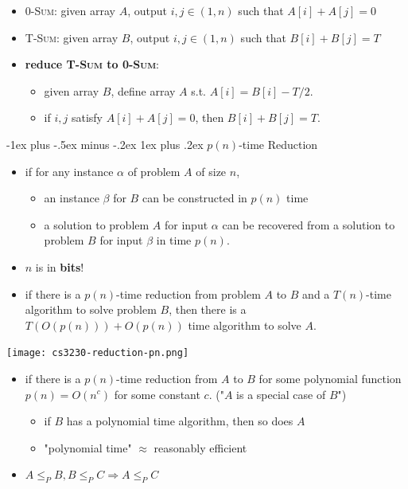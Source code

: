 \documentclass[10pt, landscape]{article}
\makeatletter
\renewcommand{\subsubsection}{\@startsection{subsubsection}{3}{0mm}%
  {-1ex plus -.5ex minus -.2ex}%
  {1ex plus .2ex}%
{\normalfont\small\bfseries}}%
\makeatother
\begin{document}
\begin{multicols*}{4}
  \begin{itemize}
    \item \textsc{0-Sum}: given array $A$, output $i, j \in (1, n)$ such that $A[i] + A[j] = 0$
    \item \textsc{T-Sum}: given array $B$, output $i, j \in (1, n)$ such that $B[i] + B[j] = T$
    \item \textbf{reduce \textsc{T-Sum} to \textsc{0-Sum}}:
      \begin{itemize}
        \item given array $B$, define array  $A$ s.t. $A[i] = B[i] - T/2$.
        \item if $i, j$ satisfy $A[i] + A[j] = 0$, then $B[i] + B[j] = T$.
      \end{itemize}
  \end{itemize}

  \subsubsection{$p(n)$-time Reduction}

  \begin{itemize}
    \item {} if for any instance $\alpha$ of problem $A$ of size $n$, 
      \begin{itemize}
        \item an instance $\beta$ for $B$ can be constructed in $p(n)$ time
        \item a solution to problem $A$ for input $\alpha$ can be recovered from a solution to problem $B$ for input $\beta$ in time $p(n)$.
      \end{itemize}
    \item \attention $n$ is in \textbf{bits}!
    \item if there is a $p(n)$-time reduction from problem $A$ to $B$ and a $T(n)$-time algorithm to solve problem $B$, then there is a $T(O(p(n))) + O(p(n))$ time algorithm to solve $A$.
  \end{itemize}

  \begin{tightcenter}
    \texttt{[image: cs3230-reduction-pn.png]} 
  \end{tightcenter}

  \begin{itemize}
    \item  {} if there is a $p(n)$-time reduction from $A$ to $B$ for some polynomial function $p(n) = O(n^c)$ for some constant $c$. ("$A$ is a special case of $B$")
      \begin{itemize}
        \item if $B$ has a polynomial time algorithm, then so does $A$
        \item "polynomial time" $\approx$ reasonably efficient
      \end{itemize}
    \item $A \leq_P B, B \leq_P C \Rightarrow A \leq_P C$
  \end{itemize}


\end{multicols*}
\end{document}
